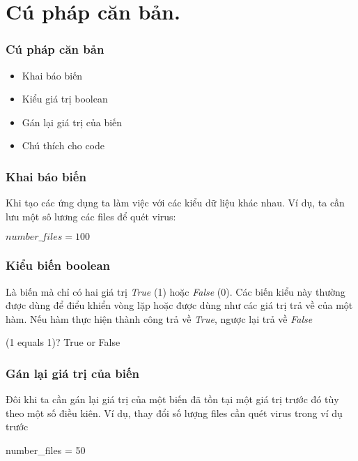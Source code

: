 \documentclass{beamer}
\begin{document}
\section{Cú pháp căn bản.}
\begin{frame}[label=cuphap]
\frametitle{Cú pháp căn bản}

\begin{itemize}
\item Khai báo biến \hyperlink{khaibaobien}{\beamerbutton{$\unrhd$}}
\item Kiểu giá trị boolean \hyperlink{boolean}{\beamerbutton{$\unrhd$}}
\item Gán lại giá trị của biến \hyperlink{ganlaibien}{\beamerbutton{$\unrhd$}}
\item Chú thích cho code \hyperlink{chuthich}{\beamerbutton{$\unrhd$}}
\end{itemize}

\hyperlink{intro}{}
\hyperlink{pheptoan}{}
\end{frame}

\begin{frame}[label=khaibaobien]
\frametitle{Khai báo biến}

Khi tạo các ứng dụng ta làm việc với các kiểu dữ liệu khác nhau. Ví dụ, ta cần lưu một sô lương các files để quét virus:

\begin{example}
$ number\_files = 100$
\end{example} 
\hyperlink{cuphap}{}
\end{frame}

\begin{frame}[label=boolean]
\frametitle{Kiểu biến boolean}
Là biến mà chỉ có hai giá trị \textit{True} (1) hoặc \textit{False} (0). Các biến kiểu này thường được dùng để điểu khiển vòng lặp hoặc được dùng như các giá trị trả về của một hàm. Nếu hàm thực hiện thành công trả về \textit{True}, ngược lại trả về \textit{False} 

\begin{example}
(1 equals 1)? True or False
\end{example} 
\hyperlink{cuphap}{}
\end{frame}

\begin{frame}[label=ganlaibien]
\frametitle{Gán lại giá trị của biến}
Đôi khi ta cần gán lại giá trị của một biến đã tồn tại một giá trị trước đó tùy theo một số điều kiên. Ví dụ, thay đổi số lượng files cần quét virus trong ví dụ trước 

\begin{example}
number\_files = 50
\end{example} 
\hyperlink{cuphap}{}
\end{frame}
\end{document}
